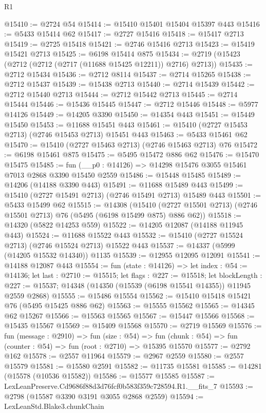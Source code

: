 \begin{lexlean}{R1}
\begin{coremodule}
@15410 := @2724 @54
@15414 := @15410 @15401 @15404 @15397 @443
@15416 := @5433 @15414 @62
@15417 := @2727 @15416
@15418 := @15417 @2713
@15419 := @2725 @15418
@15421 := @2746 @15416 @2713
@15423 := @15419 @15421 @2713
@15425 := @6198 @15414 @875
@15434 := @2719 (@15423 (@2712 (@2712 (@2717 (@11688 @15425 @12211)) @2716) @2713))
@15435 := @2712 @15434
@15436 := @2712 @8114
@15437 := @2714 @15265
@15438 := @2712 @15437
@15439 := @15438 @2713
@15440 := @2714 @15439
@15442 := @2712 @15440 @2713
@15444 := @2712 @15442 @2713
@15445 := @2714 @15444
@15446 := @15436 @15445
@15447 := @2712 @15446
@15448 := @5977 @14126
@15449 := @14205 @3390
@15450 := @14354 @443
@15451 := @15449 @15450
@15453 := @11688 @15451 @443
@15461 := @15410 (@2727 @15453 @2713) (@2746 @15453 @2713) @15451 @443
@15463 := @5433 @15461 @62
@15470 := @15410 (@2727 @15463 @2713) (@2746 @15463 @2713) @76
@15472 := @6198 @15461 @875
@15475 := @5495 @15472 @886 @62
@15476 := @15470 @15475
@15485 := fun (__p0 : @14126) => @14298 @15476 @3055 @15461 @7013 @2868 @3390 @15450 @2559
@15486 := @15448 @15485
@15489 := @14206 (@14188 @3390 @443)
@15491 := @11688 @15489 @443
@15499 := @15410 (@2727 @15491 @2713) (@2746 @15491 @2713) @15489 @443
@15501 := @5433 @15499 @62
@15515 := @14308
    (@15410 (@2727 @15501 @2713) (@2746 @15501 @2713) @76 (@5495 (@6198 @15499 @875) @886 @62))
@15518 := @14320 (@5822 @14253 @559)
@15522 := @14205 @12087 (@14188 @11945 @443)
@15524 := @11688 @15522 @443
@15532 := @15410 (@2727 @15524 @2713) (@2746 @15524 @2713) @15522 @443
@15537 := @14337 (@5999 (@14205 @15532 @14340)) @1135
@15539 := @12955 @12095 @12091
@15541 := @14188 @12087 @443
@15554 := fun (state : @14126) =>
  let index : @54 := @14136;
  let last : @2710 := @15515;
  let flags : @227 := @15518;
  let blockLength : @227 := @15537;
  @14348 (@14350 (@15539 (@6198 @15541 @14355)) @11945 @2559 @2868)
@15555 := @15486 @15554
@15562 := @15410 @15418 @15421 @76 (@5495 @15425 @886 @62)
@15563 := @15555 @15562
@15565 := @14345 @62 @15267
@15566 := @15563 @15565
@15567 := @15447 @15566
@15568 := @15435 @15567
@15569 := @15409 @15568
@15570 := @2719 @15569
@15576 := fun (message : @2910) =>
  fun (size : @54) =>
  fun (chunk : @54) => fun (counter : @54) => fun (root : @2710) => @15395 @15570
@15577 := @2792 @162
@15578 := @2557 @11964
@15579 := @2967 @2559
@15580 := @2557 @15579
@15581 := @15580 @2591
@15582 := @11735 @15581
@15585 := @14281 (@15578 (@10536 @15582))
@15586 := @15577 @15585
@15587 := LexLeanPreserve.Cd9686f88d3d76fcf0b583f359c728594.R1.__fits_7
@15593 := @2798 (@15587 @3390 @3191 @3055 @2868 @2559)
@15594 := LexLeanStd.Blake3.chunkChain

\end{coremodule}
\end{lexlean}
